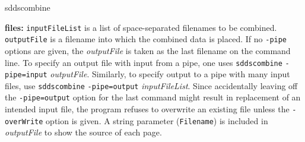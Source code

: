 \begin{sddsprog}{sddscombine}
  \item \textbf{files:} \verb|inputFileList| is a list of space-separated filenames to be combined. \verb|outputFile| is a filename into which the combined data is placed. If no \verb|-pipe| options are given, the \emph{outputFile} is taken as the last filename on the command line. To specify an output file with input from a pipe, one uses \verb|sddscombine| \verb|-pipe=input| \emph{outputFile}. Similarly, to specify output to a pipe with many input files, use \verb|sddscombine| \verb|-pipe=output| \emph{inputFileList}. Since accidentally leaving off the \verb|-pipe=output| option for the last command might result in replacement of an intended input file, the program refuses to overwrite an existing file unless the \verb|-overWrite| option is given. A string parameter (\verb|Filename|) is included in \emph{outputFile} to show the source of each page.


\end{sddsprog}
